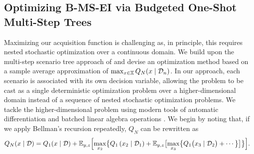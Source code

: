 \subsection{Optimizing B-MS-EI via Budgeted One-Shot Multi-Step Trees}
\label{subsec:max}
Maximizing our acquisition function is challenging as, in principle, this requires nested stochastic optimization over a continuous domain. We build upon the multi-step scenario tree approach of \cite{jiang2020efficient} and devise an optimization method based on a sample average approximation of $\max_{x\in\mathbb{X}} Q_N(x\mid \mathcal{D}_n)$.
In our approach, each scenario is associated with its own decision variable, allowing the problem to be cast as a single deterministic optimization problem over a higher-dimensional domain instead of a sequence of nested stochastic optimization problems. We tackle the higher-dimensional problem using modern tools of automatic differentiation and batched linear algebra operations \citep{balandat2020botorch}. We begin by noting that, if we apply Bellman's recursion repeatedly, $Q_N$ can be rewritten as
\begin{align*}
    Q_{N}(x\mid\mathcal{D}) =  Q_1(x\mid \mathcal{D}) + \mathbb{E}_{y, z}\Bigl[\max_{x_2}\bigl\{Q_1\left(x_2\mid \mathcal{D}_1\right) +
     \mathbb{E}_{y,z}\bigl[\max_{x_3}\bigl\{Q_1\bigl(x_3\mid \mathcal{D}_2 \bigr) + \cdots \bigl\} \bigl ] \bigl\} \Bigr].
\end{align*}

